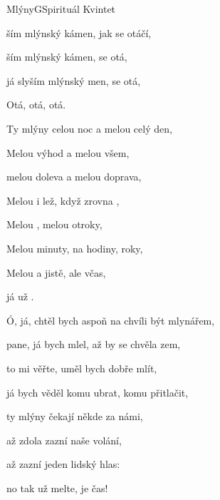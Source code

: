 \setcounter{page}{52}
\begin{song}{Mlýny}{G}{Spirituál Kvintet}

\begin{SBChorus}

ším mlýnský kámen, jak se otáčí,

ším mlýnský kámen,  se otá,

já slyším mlýnský men,  se otá,

Otá, otá, otá.

\end{SBChorus}

\begin{SBVerse}

Ty mlýny  celou noc a melou celý den,

Melou  výhod a melou  všem,

melou doleva a melou doprava,

Melou  i lež, když zrovna ,

Melou , melou otroky,

Melou  minuty, na hodiny,  roky,

Melou  a jistě, ale  včas,

já už   .

\end{SBVerse}

\begin{SBChorus}

\end{SBChorus}

\begin{SBVerse}

Ó, já, chtěl bych aspoň na chvíli být mlynářem,

pane, já bych mlel, až by se chvěla zem,

to mi věřte, uměl bych dobře mlít,

já bych věděl komu ubrat, komu přitlačit,

ty mlýny čekají někde za námi,

až zdola zazní naše volání,

až zazní jeden lidský hlas:

no tak už melte, je čas!

\end{SBVerse}

\begin{SBChorus}

\end{SBChorus}

\end{song}

\clearpage
